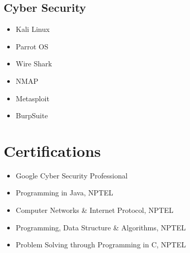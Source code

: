 \documentclass[]{roshan-resume}
\begin{document}
\begin{minipage}[t]{0.33\textwidth}
		\subsection{Cyber Security}
		\begin{itemize}
			\item Kali Linux \\
			\item Parrot OS \\
			\item Wire Shark \\
			\item NMAP \\
			\item Metasploit \\
			\item BurpSuite
		\end{itemize}
		
		
		\section{Certifications}
		\begin{itemize}
			\item Google Cyber Security Professional
			\item Programming in Java, NPTEL
			\item Computer Networks \& Internet Protocol, NPTEL
			\item Programming, Data Structure \& Algorithms, NPTEL
			\item Problem Solving through Programming in C, NPTEL
		\end{itemize}
		
		
		
	\end{minipage} 
	\hfill
\end{document}
